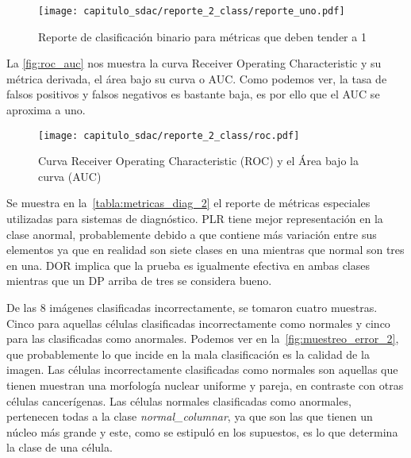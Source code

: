 \begin{figure}[H]
    \centering
    \texttt{[image: capitulo\_sdac/reporte\_2\_class/reporte\_uno.pdf]}
    \caption{Reporte de clasificación binario para métricas que deben tender a 1}\label{fig:reporte_2_1}
\end{figure}

La \autoref{fig:roc_auc} nos muestra la curva Receiver Operating Characteristic
y su métrica derivada, el área bajo su curva o AUC. Como podemos ver, la tasa de
falsos positivos y falsos negativos es bastante baja, es por ello que el AUC se
aproxima a uno.

\begin{figure}[H]
    \centering
    \texttt{[image: capitulo\_sdac/reporte\_2\_class/roc.pdf]}
    \caption{Curva Receiver Operating Characteristic (ROC) y el Área bajo la curva (AUC)}\label{fig:roc_auc}
\end{figure}

Se muestra en la~\autoref{tabla:metricas_diag_2} el reporte de métricas
especiales utilizadas para sistemas de diagnóstico. PLR tiene mejor
representación en la clase anormal, probablemente debido a que contiene más
variación entre sus elementos ya que en realidad son siete clases en una
mientras que normal son tres en una. DOR implica que la prueba es igualmente
efectiva en ambas clases mientras que un DP arriba de tres se considera bueno.

\begin{table}[H]
    \centering
    \caption{Métricas para diagnóstico binario}\label{tabla:metricas_diag_2}
    \end{table}

De las 8 imágenes clasificadas incorrectamente, se tomaron cuatro muestras.
Cinco para aquellas células clasificadas incorrectamente como normales y cinco
para las clasificadas como anormales. Podemos ver en
la~\autoref{fig:muestreo_error_2}, que probablemente lo que incide en la mala
clasificación es la calidad de la imagen. Las células incorrectamente
clasificadas como normales son aquellas que tienen muestran una morfología
nuclear uniforme y pareja, en contraste con otras células cancerígenas. Las
células normales clasificadas como anormales, pertenecen todas a la clase
\emph{normal\_columnar}, ya que son las que tienen un núcleo más grande y este,
como se estipuló en los supuestos, es lo que determina la clase de una célula.

